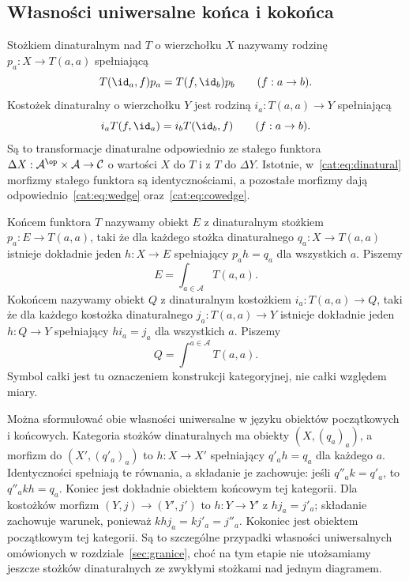 \subsection{Własności uniwersalne końca i kokońca}
\begin{definicja}\label{cat:def:wedges}
Stożkiem dinaturalnym nad $T$ o wierzchołku $X$ nazywamy rodzinę $p_a:X\to T(a,a)$ spełniającą
\begin{equation}\label{cat:eq:wedge}
 T(\id_a,f)p_a=T(f,\id_b)p_b\qquad(f:a\to b).
\end{equation}
Kostożek dinaturalny o wierzchołku $Y$ jest rodziną $i_a:T(a,a)\to Y$ spełniającą
\begin{equation}\label{cat:eq:cowedge}
 i_a T(f,\id_a)=i_b T(\id_b,f)\qquad(f:a\to b).
\end{equation}
Są to transformacje dinaturalne odpowiednio ze stałego funktora $\Delta X:\mathcal A^{\op}\times\mathcal A\to\mathcal C$ o wartości $X$ do $T$ i z $T$ do $\Delta Y$. Istotnie, w~\eqref{cat:eq:dinatural} morfizmy stałego funktora są identycznościami, a pozostałe morfizmy dają odpowiednio~\eqref{cat:eq:wedge} oraz~\eqref{cat:eq:cowedge}.
\end{definicja}
\begin{definicja}\label{cat:def:end-coend}
Końcem funktora $T$ nazywamy obiekt $E$ z dinaturalnym stożkiem $p_a:E\to T(a,a)$, taki że dla każdego stożka dinaturalnego $q_a:X\to T(a,a)$ istnieje dokładnie jeden $h:X\to E$ spełniający $p_a h=q_a$ dla wszystkich $a$. Piszemy
\[
 E=\int_{a\in\mathcal A}T(a,a).
\]
Kokońcem nazywamy obiekt $Q$ z dinaturalnym kostożkiem $i_a:T(a,a)\to Q$, taki że dla każdego kostożka dinaturalnego $j_a:T(a,a)\to Y$ istnieje dokładnie jeden $h:Q\to Y$ spełniający $h i_a=j_a$ dla wszystkich $a$. Piszemy
\[
 Q=\int^{a\in\mathcal A}T(a,a).
\]
Symbol całki jest tu oznaczeniem konstrukcji kategoryjnej, nie całki względem miary.
\end{definicja}
Można sformułować obie własności uniwersalne w języku obiektów początkowych i końcowych. Kategoria stożków dinaturalnych ma obiekty $(X,(q_a)_a)$, a morfizm do $(X',(q'_a)_a)$ to $h:X\to X'$ spełniający $q'_a h=q_a$ dla każdego $a$. Identyczności spełniają te równania, a składanie je zachowuje: jeśli $q''_a k=q'_a$, to $q''_a kh=q_a$. Koniec jest dokładnie obiektem końcowym tej kategorii. Dla kostożków morfizm $(Y,j)\to(Y',j')$ to $h:Y\to Y'$ z $hj_a=j'_a$; składanie zachowuje warunek, ponieważ $khj_a=kj'_a=j''_a$. Kokoniec jest obiektem początkowym tej kategorii. Są to szczególne przypadki własności uniwersalnych omówionych w rozdziale~\ref{sec:granice}, choć na tym etapie nie utożsamiamy jeszcze stożków dinaturalnych ze zwykłymi stożkami nad jednym diagramem.
